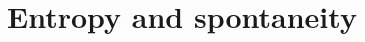 \documentclass{book}
\begin{document}
 
 
  \newcommand\chapterlabel{}\newcommand\ChapterNameLabel{}\newcommand\labname{}\newcommand\chapterpathtocontent{}\newcommand\chapterpathtoimages{}\newcommand\chapterpath{} 

\section{Entropy and spontaneity}
\renewcommand\chapterlabel{Ch-thermo}\renewcommand\ChapterNameLabel{\chapterlabel}\renewcommand\labname{entropy}\renewcommand\chapterpathtocontent{../../}\renewcommand\chapterpathtoimages{\chapterpathtocontent}\renewcommand\chapterpath{../../\chapterlabel/LAB-\labname/}

 
 
\end{document}
